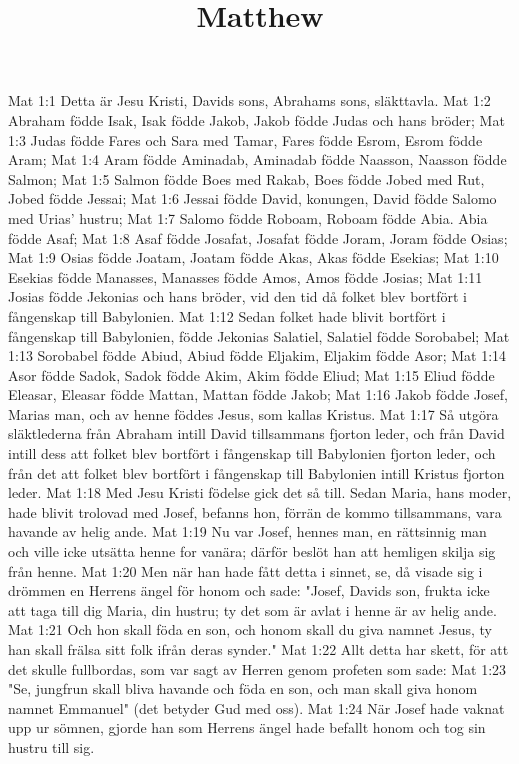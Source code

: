 

\title{Matthew}

Mat 1:1  Detta är Jesu Kristi, Davids sons, Abrahams sons, släkttavla.
Mat 1:2  Abraham födde Isak, Isak födde Jakob, Jakob födde Judas och hans bröder;
Mat 1:3  Judas födde Fares och Sara med Tamar, Fares födde Esrom, Esrom födde Aram;
Mat 1:4  Aram födde Aminadab, Aminadab födde Naasson, Naasson födde Salmon;
Mat 1:5  Salmon födde Boes med Rakab, Boes födde Jobed med Rut, Jobed födde Jessai;
Mat 1:6  Jessai födde David, konungen, David födde Salomo med Urias' hustru;
Mat 1:7  Salomo födde Roboam, Roboam födde Abia. Abia födde Asaf;
Mat 1:8  Asaf födde Josafat, Josafat födde Joram, Joram födde Osias;
Mat 1:9  Osias födde Joatam, Joatam födde Akas, Akas födde Esekias;
Mat 1:10  Esekias födde Manasses, Manasses födde Amos, Amos födde Josias;
Mat 1:11  Josias födde Jekonias och hans bröder, vid den tid då folket blev bortfört i fångenskap till Babylonien.
Mat 1:12  Sedan folket hade blivit bortfört i fångenskap till Babylonien, födde Jekonias Salatiel, Salatiel födde Sorobabel;
Mat 1:13  Sorobabel födde Abiud, Abiud födde Eljakim, Eljakim födde Asor;
Mat 1:14  Asor födde Sadok, Sadok födde Akim, Akim födde Eliud;
Mat 1:15  Eliud födde Eleasar, Eleasar födde Mattan, Mattan födde Jakob;
Mat 1:16  Jakob födde Josef, Marias man, och av henne föddes Jesus, som kallas Kristus.
Mat 1:17  Så utgöra släktlederna från Abraham intill David tillsammans fjorton leder, och från David intill dess att folket blev bortfört i fångenskap till Babylonien fjorton leder, och från det att folket blev bortfört i fångenskap till Babylonien intill Kristus fjorton leder.
Mat 1:18  Med Jesu Kristi födelse gick det så till. Sedan Maria, hans moder, hade blivit trolovad med Josef, befanns hon, förrän de kommo tillsammans, vara havande av helig ande.
Mat 1:19  Nu var Josef, hennes man, en rättsinnig man och ville icke utsätta henne for vanära; därför beslöt han att hemligen skilja sig från henne.
Mat 1:20  Men när han hade fått detta i sinnet, se, då visade sig i drömmen en Herrens ängel för honom och sade: "Josef, Davids son, frukta icke att taga till dig Maria, din hustru; ty det som är avlat i henne är av helig ande.
Mat 1:21  Och hon skall föda en son, och honom skall du giva namnet Jesus, ty han skall frälsa sitt folk ifrån deras synder."
Mat 1:22  Allt detta har skett, för att det skulle fullbordas, som var sagt av Herren genom profeten som sade:
Mat 1:23  "Se, jungfrun skall bliva havande och föda en son, och man skall giva honom namnet Emmanuel" (det betyder Gud med oss).
Mat 1:24  När Josef hade vaknat upp ur sömnen, gjorde han som Herrens ängel hade befallt honom och tog sin hustru till sig.
